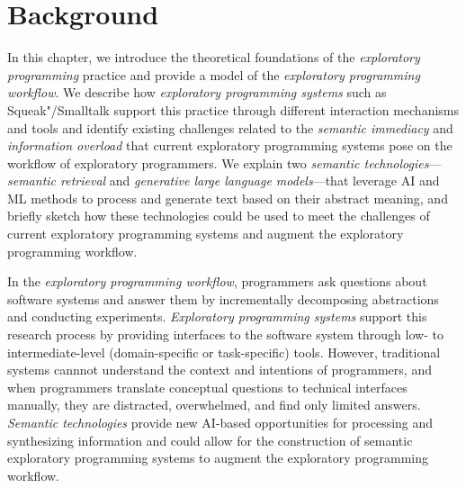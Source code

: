 
\chapter{Background}
\label{cha:background}

In this chapter, we introduce the theoretical foundations of the \emph{exploratory programming} practice and provide a model of the \emph{exploratory programming workflow}.
We describe how \emph{exploratory programming systems} such as Squeak"/Smalltalk support this practice through different interaction mechanisms and tools and identify existing challenges related to the \emph{semantic immediacy} and \emph{information overload} that current exploratory programming systems pose on the workflow of exploratory programmers.
We explain two \emph{semantic technologies}---\emph{semantic retrieval} and \emph{generative large language models}---that leverage AI and ML methods to process and generate text based on their abstract meaning, and briefly sketch how these technologies could be used to meet the challenges of current exploratory programming systems and augment the exploratory programming workflow.


\begin{summary}
	In the \emph{exploratory programming workflow}, programmers ask questions about software systems and answer them by incrementally decomposing abstractions and conducting experiments.
	\emph{Exploratory programming systems} support this research process by providing interfaces to the software system through low- to intermediate-level (domain-specific or task-specific) tools.
	However, traditional systems cannnot understand the context and intentions of programmers, and when programmers translate conceptual questions to technical interfaces manually, they are distracted, overwhelmed, and find only limited answers.
	\emph{Semantic technologies} provide new AI-based opportunities for processing and synthesizing information and could allow for the construction of semantic exploratory programming systems to augment the exploratory programming workflow.
\end{summary}
